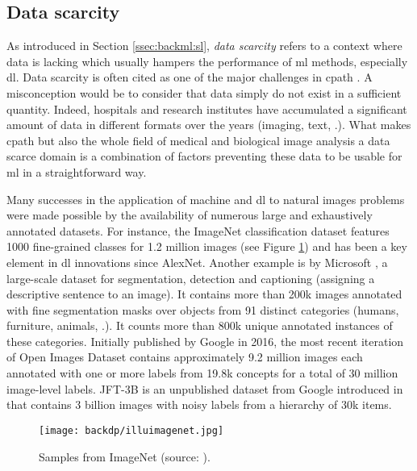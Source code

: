 \subsection{Data scarcity}
\label{ssec:backdp:datascarcity}

As introduced in Section \ref{ssec:backml:sl}, \textit{data scarcity} refers to a context where data is lacking which usually hampers the performance of \acrlong{ml} methods, especially \acrlong{dl}. Data scarcity is often cited as one of the major challenges in \acrlong{cpath} \cite{tizhoosh2018artificial,litjens2017survey,robertson2018digital,komura2018machine}. A misconception would be to consider that data simply do not exist in a sufficient quantity. Indeed, hospitals and research institutes have accumulated a significant amount of data in different formats over the years (imaging, text, \etc.). What makes \acrlong{cpath} but also the whole field of medical and biological image analysis a data scarce domain is a combination of factors preventing these data to be usable for \acrlong{ml} in a straightforward way.

Many successes in the application of machine and \acrlong{dl} to natural images problems were made possible by the availability of numerous large and exhaustively annotated datasets. For instance, the ImageNet classification dataset features 1000 fine-grained classes for 1.2 million images (see Figure \ref{fig:backdp:illusimagenet}) and has been a key element in \acrlong{dl} innovations since AlexNet. Another example is  by Microsoft \cite{lin2014microsoft}, a large-scale dataset for segmentation, detection and captioning (\ie assigning a descriptive sentence to an image). It contains more than 200k images annotated with fine segmentation masks over objects from 91 distinct categories (\ie humans, furniture, animals, \etc.). It counts more than 800k unique annotated instances of these categories. Initially published by Google in 2016, the most recent iteration of Open Images Dataset \cite{kuznetsova2020open} contains approximately 9.2 million images each annotated with one or more labels from 19.8k concepts for a total of 30 million image-level labels. JFT-3B is an unpublished dataset from Google introduced in \cite{zhai2106scaling} that contains 3 billion images with noisy labels from a hierarchy of 30k items.

\begin{figure}
  \centering
  \texttt{[image: backdp/illuimagenet.jpg]}
  \caption{Samples from ImageNet (source: \cite{img:imagenet}).}
  \label{fig:backdp:illusimagenet}
\end{figure}

